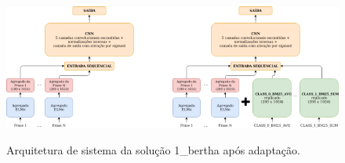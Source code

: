 \begin{figure}[h]
    \centering
    \caption{Arquitetura de sistema da solução 1\_bertha após adaptação.}
    \begin{center}
        \begin{overprint}
            \centering\includegraphics[width=0.50\textwidth]{img/1-bertha-arquitetura-sem-ri.png}\centering\includegraphics[width=0.50\textwidth]{img/1-bertha-arquitetura-com-ri.png}
        \end{overprint}
    \end{center}
    \vspace{-0.0cm}
    \label{fig:1-bertha-arquitetura-com-ri}
\end{figure}